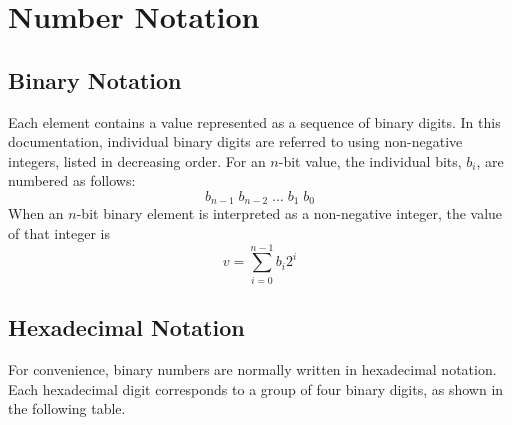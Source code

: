 \documentclass[a4paper,12pt]{article}
\theoremstyle{definition}
\begin{document}
\appendix

\section{Number Notation}
\label{sec:number-notation}

\subsection{Binary Notation}
\label{sec:binary-notation}

Each element contains a value represented as a sequence of binary digits.
In this documentation, individual binary digits are referred to using non-negative integers, listed in decreasing order.
For an $n$-bit value, the individual bits, $b_i$, are numbered as follows:
\[ b_{n-1} \; b_{n-2} \; \ldots \; b_{1} \; b_{0} \]
When an $n$-bit binary element is interpreted as a non-negative integer, the value of that integer is
\[
    v = \sum_{i=0}^{n-1} b_{i}2^{i}
\]

\subsection{Hexadecimal Notation}
\label{sec:hexadecimal-notation}

For convenience, binary numbers are normally written in hexadecimal notation.
Each hexadecimal digit corresponds to a group of four binary digits, as shown in the following table.
\end{document}
